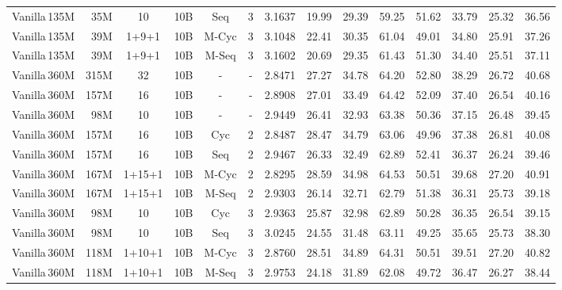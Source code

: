\begin{table}[h!]
{\begin{tabular}{l|ccc|cc|c|cccccc|c}
    Vanilla\,135M & \,\,\,35M & 10 & 10B & Seq & 3 & 3.1637 & 19.99 & 29.39 & 59.25 & 51.62 & 33.79 & 25.32 & 36.56 \\
    \rowcolor[gray]{0.9}
    Vanilla\,135M & \,\,\,39M & 1+9+1 & 10B & M-Cyc & 3 & 3.1048 & 22.41 & 30.35 & 61.04 & 49.01 & 34.80 & 25.91 & 37.26 \\
    Vanilla\,135M & \,\,\,39M & 1+9+1 & 10B & M-Seq & 3 & 3.1602 & 20.69 & 29.35 & 61.43 & 51.30 & 34.40 & 25.51 & 37.11 \\
    \midrule
    \midrule
    Vanilla\,360M & 315M & 32 & 10B & - & - & 2.8471 & 27.27 & 34.78 & 64.20 & 52.80 & 38.29 & 26.72 & 40.68 \\
    Vanilla\,360M & 157M & 16 & 10B & - & - & 2.8908 & 27.01 & 33.49 & 64.42 & 52.09 & 37.40 & 26.54 & 40.16 \\
    Vanilla\,360M & \,\,\,98M & 10 & 10B & - & - & 2.9449 & 26.41 & 32.93 & 63.38 & 50.36 & 37.15 & 26.48 & 39.45 \\
    \midrule
    Vanilla\,360M & 157M & 16 & 10B & Cyc & 2 & 2.8487 & 28.47 & 34.79 & 63.06 & 49.96 & 37.38 & 26.81 & 40.08 \\
    Vanilla\,360M & 157M & 16 & 10B & Seq & 2 & 2.9467 & 26.33 & 32.49 & 62.89 & 52.41 & 36.37 & 26.24 & 39.46 \\
    \rowcolor[gray]{0.9}
    Vanilla\,360M & 167M & 1+15+1 & 10B & M-Cyc & 2 & 2.8295 & 28.59 & 34.98 & 64.53 & 50.51 & 39.68 & 27.20 & 40.91 \\
    Vanilla\,360M & 167M & 1+15+1 & 10B & M-Seq & 2 & 2.9303 & 26.14 & 32.71 & 62.79 & 51.38 & 36.31 & 25.73 & 39.18 \\
    \midrule
    Vanilla\,360M & \,\,\,98M & 10 & 10B & Cyc & 3 & 2.9363 & 25.87 & 32.98 & 62.89 & 50.28 & 36.35 & 26.54 & 39.15 \\
    Vanilla\,360M & \,\,\,98M & 10 & 10B & Seq & 3 & 3.0245 & 24.55 & 31.48 & 63.11 & 49.25 & 35.65 & 25.73 & 38.30 \\
    \rowcolor[gray]{0.9}
    Vanilla\,360M & 118M & 1+10+1 & 10B & M-Cyc & 3 & 2.8760 & 28.51 & 34.89 & 64.31 & 50.51 & 39.51 & 27.20 & 40.82 \\
    Vanilla\,360M & 118M & 1+10+1 & 10B & M-Seq & 3 & 2.9753 & 24.18 & 31.89 & 62.08 & 49.72 & 36.47 & 26.27 & 38.44 \\
    \bottomrule
  \end{tabular}
  }
  
\end{table}